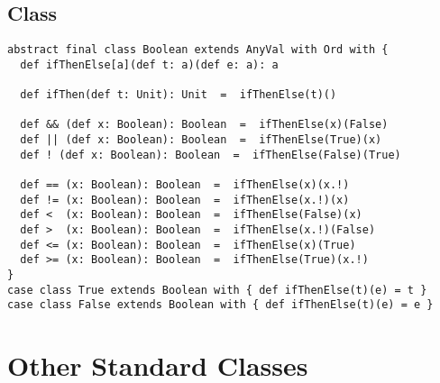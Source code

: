 \documentclass[a4paper,12pt,twoside,titlepage]{book}
\begin{document}
\subsection{Class }
\label{sec:cls-boolean}

\begin{lstlisting}
abstract final class Boolean extends AnyVal with Ord with {
  def ifThenElse[a](def t: a)(def e: a): a

  def ifThen(def t: Unit): Unit  =  ifThenElse(t)()

  def && (def x: Boolean): Boolean  =  ifThenElse(x)(False)
  def || (def x: Boolean): Boolean  =  ifThenElse(True)(x)
  def ! (def x: Boolean): Boolean  =  ifThenElse(False)(True)

  def == (x: Boolean): Boolean  =  ifThenElse(x)(x.!)
  def != (x: Boolean): Boolean  =  ifThenElse(x.!)(x)
  def <  (x: Boolean): Boolean  =  ifThenElse(False)(x)
  def >  (x: Boolean): Boolean  =  ifThenElse(x.!)(False)
  def <= (x: Boolean): Boolean  =  ifThenElse(x)(True)
  def >= (x: Boolean): Boolean  =  ifThenElse(True)(x.!)
}
case class True extends Boolean with { def ifThenElse(t)(e) = t }
case class False extends Boolean with { def ifThenElse(t)(e) = e }
\end{lstlisting}


\section{Other Standard Classes}
\end{document}

